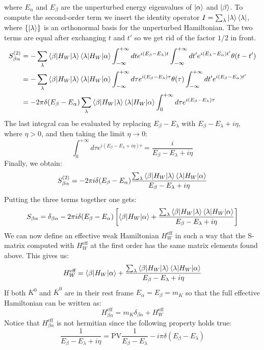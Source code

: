 \documentclass[../main.tex]{subfiles}
\begin{document}
where $E_\alpha$ and $E_\beta$ are the unperturbed energy eigenvalues of $\ket{\alpha}$ and $\ket{\beta}$. To compute the second-order term we insert the identity operator $I=\sum_\lambda\ket{\lambda}\bra{\lambda}$, where $\{\ket{\lambda}\}$ is an orthonormal basis for the unperturbed Hamiltonian. The two terms are equal after exchanging $t$ and $t'$ so we get rid of the factor $1/2$ in front.
\begin{align*}
S_{\beta\alpha}^{(2)}&=-\sum_\lambda\braket{\beta|H_W|\lambda}\braket{\lambda|H_W|\alpha}\int_{-\infty}^{+\infty}dte^{i(E_\beta-E_\lambda)t}\int_{-\infty}^{+\infty}dt'e^{i(E_\lambda-E_\alpha)t'}\theta(t-t')\\
&=-\sum_\lambda\braket{\beta|H_W|\lambda}\braket{\lambda|H_W|\alpha}\int_{-\infty}^{+\infty}d\tau e^{i(E_\beta-E_\lambda)\tau}\theta(\tau)\int_{-\infty}^{+\infty}dt'e^{i(E_\beta-E_\alpha)t'}\\
&=-2\pi\delta(E_\beta-E_\alpha)\sum_\lambda\braket{\beta|H_W|\lambda}\braket{\lambda|H_W|\alpha}\int_0^{+\infty}d\tau e^{i(E_\beta-E_\lambda)\tau}
\end{align*}
The last integral can be evaluated by replacing $E_\beta-E_\lambda$ with $E_\beta-E_\lambda+i\eta$, where $\eta>0$, and then taking the limit $\eta\to0$:
\[
\int_0^{+\infty}d\tau e^{i(E_\beta-E_\lambda+i\eta)\tau}=\frac{i}{E_\beta-E_\lambda+i\eta}
\]
Finally, we obtain:
\[
S_{\beta\alpha}^{(2)}=-2\pi i\delta(E_\beta-E_\alpha)\frac{\sum_\lambda\braket{\beta|H_W|\lambda}\braket{\lambda|H_W|\alpha}}{E_\beta-E_\lambda+i\eta}
\]
Putting the three terms together one gets:
\[
S_{\beta\alpha}=\delta_{\beta\alpha}-2\pi i\delta(E_\beta-E_\alpha)\left[\braket{\beta|H_W|\alpha}+\frac{\sum_\lambda\braket{\beta|H_W|\lambda}\braket{\lambda|H_W|\alpha}}{E_\beta-E_\lambda+i\eta}\right]
\]
We can now define an effective weak Hamiltonian $H_W^{\text{eff}}$ in such a way that the S-matrix computed with $H_W^{\text{eff}}$ at the first order has the same matrix elements found above. This gives us:
\[
H_W^{\text{eff}}=\braket{\beta|H_W|\alpha}+\frac{\sum_\lambda\braket{\beta|H_W|\lambda}\braket{\lambda|H_W|\alpha}}{E_\beta-E_\lambda+i\eta}
\]
If both $K^0$ and $\overline{K}^0$ are in their rest frame $E_\alpha=E_\beta=m_K$ so that the full effective Hamiltonian can be written as:
\[
H_{\beta\alpha}^{\text{eff}}=m_K\delta_{\beta\alpha}+H_W^{\text{eff}}
\]
Notice that $H_{\beta\alpha}^{\text{eff}}$ is not hermitian since the following property holds true:
\[
\frac{1}{E_\beta-E_\lambda+i\eta}=\text{PV}\frac{1}{E_\beta-E_\lambda}-i\pi\delta(E_\beta-E_\lambda)
\]
\end{document}
